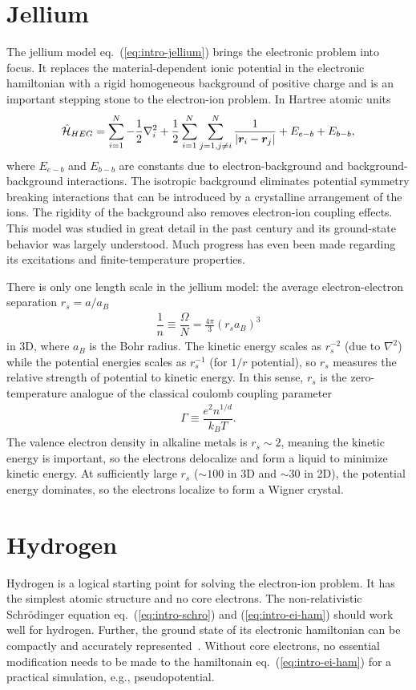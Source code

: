 \section{Jellium}
The jellium model eq.~(\ref{eq:intro-jellium}) brings the electronic problem into focus. It replaces the material-dependent ionic potential in the electronic hamiltonian with a rigid homogeneous background of positive charge and is an important stepping stone to the electron-ion problem. In Hartree atomic units
\begin{align} \label{eq:intro-jellium}
\hat{\mathcal{H}}_{HEG} = \sum\limits_{i=1}^N -\dfrac{1}{2}\nabla_i^2 + \frac{1}{2}\sum\limits_{i=1}^N\sum\limits_{j=1,j\neq i}^N
\dfrac{1}{\vert \boldsymbol{r}_i-\boldsymbol{r}_j \vert}
+E_{e-b}+E_{b-b},
\end{align}
where $E_{e-b}$ and $E_{b-b}$ are constants due to electron-background and background-background interactions. The isotropic background eliminates potential symmetry breaking interactions that can be introduced by a crystalline arrangement of the ions. The rigidity of the background also removes electron-ion coupling effects. This model was studied in great detail in the past century and its ground-state behavior was largely understood. Much progress has even been made regarding its excitations and finite-temperature properties.

There is only one length scale in the jellium model: the average electron-electron separation $r_s=a/a_B$
\begin{align}
\dfrac{1}{n} \equiv \dfrac{\Omega}{N} = \frac{4\pi}{3}(r_sa_B)^3
\end{align}
in 3D, where $a_B$ is the Bohr radius. The kinetic energy scales as $r_s^{-2}$ (due to $\nabla^2$) while the potential energies scales as $r_s^{-1}$ (for $1/r$ potential), so $r_s$ measures the relative strength of potential to kinetic energy. In this sense, $r_s$ is the zero-temperature analogue of the classical coulomb coupling parameter
\begin{align}
\Gamma \equiv \dfrac{e^2n^{1/d}}{k_BT}.
\end{align}
The valence electron density in alkaline metals is $r_s\sim2$, meaning the kinetic energy is important, so the electrons delocalize and form a liquid to minimize kinetic energy. At sufficiently large $r_s$ ($\sim 100$ in 3D and $\sim 30$ in 2D), the potential energy dominates, so the electrons localize to form a Wigner crystal.

\section{Hydrogen}
Hydrogen is a logical starting point for solving the electron-ion problem.
It has the simplest atomic structure and no core electrons.
The non-relativistic Schr\"odinger equation eq.~(\ref{eq:intro-schro}) and (\ref{eq:intro-ei-ham}) should work well for hydrogen. Further, the ground state of its electronic hamiltonian can be compactly and accurately represented~\cite{Holzmann2003}.
Without core electrons, no essential modification needs to be made to the hamiltonain eq.~(\ref{eq:intro-ei-ham}) for a practical simulation, e.g., pseudopotential.

